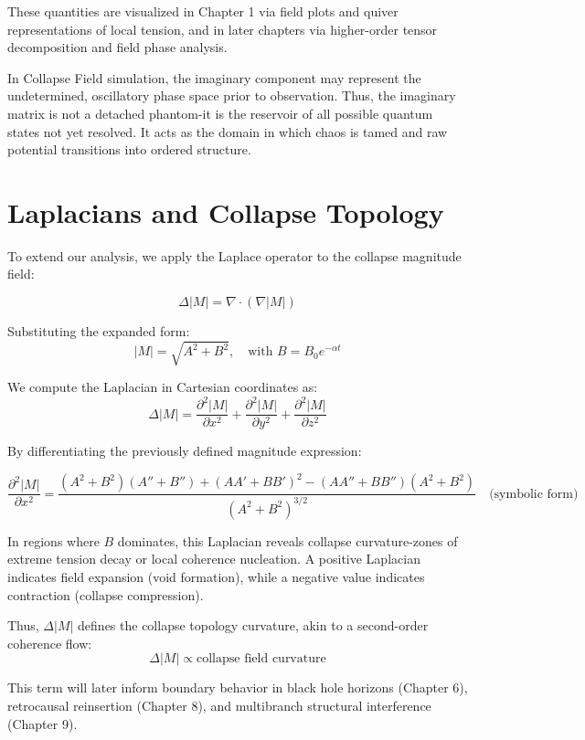 These quantities are visualized in Chapter 1 via field plots and quiver representations of local tension, and in later chapters via higher-order tensor decomposition and field phase analysis. \cite{imaginary_meta}

In Collapse Field simulation, the imaginary component may represent the undetermined, oscillatory phase space prior to observation. \cite{imaginary_meta} Thus, the imaginary matrix is not a detached phantom-it is the reservoir of all possible quantum states not yet resolved. \cite{imaginary_meta} It acts as the domain in which chaos is tamed and raw potential transitions into ordered structure. 

\section{Laplacians and Collapse Topology}

To extend our analysis, we apply the Laplace operator to the collapse magnitude field:

\[
\Delta |M| = \nabla \cdot \left( \nabla |M| \right)
\]

Substituting the expanded form:
\[
|M| = \sqrt{A^2 + B^2}, \quad \text{with } B = B_0 e^{-\alpha t}
\]

We compute the Laplacian in Cartesian coordinates as:
\[
\Delta |M| = \frac{\partial^2 |M|}{\partial x^2} + \frac{\partial^2 |M|}{\partial y^2} + \frac{\partial^2 |M|}{\partial z^2}
\]

By differentiating the previously defined magnitude expression:

\[
\frac{\partial^2 |M|}{\partial x^2} =
\frac{
    (A^2 + B^2)\left(A'' + B''\right) + (A A' + B B')^2 - (A A'' + B B'') (A^2 + B^2)
}
{
    (A^2 + B^2)^{3/2}
}
\quad \text{(symbolic form)}
\]

In regions where $B$ dominates, this Laplacian reveals collapse curvature-zones of extreme tension decay or local coherence nucleation. \cite{imaginary_meta} A positive Laplacian indicates field expansion (void formation), while a negative value indicates contraction (collapse compression). \cite{imaginary_meta} 

Thus, $\Delta |M|$ defines the collapse topology curvature, akin to a second-order coherence flow:
\[
\Delta |M| \propto \text{collapse field curvature}
\]

This term will later inform boundary behavior in black hole horizons (Chapter 6), retrocausal reinsertion (Chapter 8), and multibranch structural interference (Chapter 9). \cite{imaginary_meta} 

